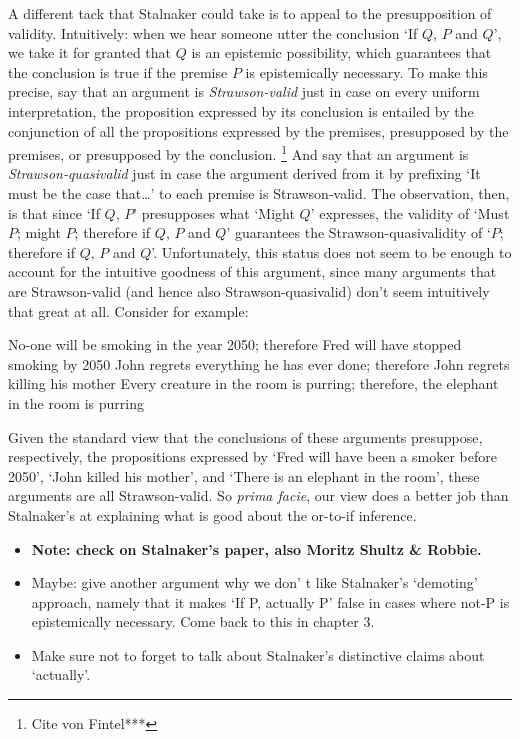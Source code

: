 \documentclass[If.tex]{subfiles}
\begin{document}
A different tack that Stalnaker could take is to appeal to the presupposition of validity.  Intuitively: when we hear someone utter the conclusion ‘If $Q$, $P$ and $Q$’, we take it for granted that $Q$ is an epistemic possibility, which guarantees that the conclusion is true if the premise $P$ is epistemically necessary.  To make this precise, say that an argument is \emph{Strawson-valid} just in case on every uniform interpretation, the proposition expressed by its conclusion is entailed by the conjunction of all the propositions expressed by the premises, presupposed by the premises, or presupposed by the conclusion.%
\footnote{Cite von Fintel***}  
And say that an argument is \emph{Strawson-quasivalid} just in case the argument derived from it by prefixing ‘It must be the case that…’ to each premise is Strawson-valid.  The observation, then, is that since ‘If $Q$, $P$’ presupposes what ‘Might $Q$’ expresses, the validity of ‘Must $P$; might $P$; therefore if $Q$, $P$ and $Q$’ guarantees the Strawson-quasivalidity of ‘$P$; therefore if $Q$, $P$ and $Q$’.  Unfortunately, this status does not seem to be enough to account for the intuitive goodness of this argument, since many arguments that are Strawson-valid (and hence also Strawson-quasivalid) don't seem intuitively that great at all.  Consider for example:
\begin{prop}
	\nitem 
	No-one will be smoking in the year 2050; therefore Fred will have stopped smoking by 2050
	\nitem 
	John regrets everything he has ever done; therefore John regrets killing his mother
	\nitem 
	Every creature in the room is purring; therefore, the elephant in the room is purring
\end{prop}
Given the standard view that the conclusions of these arguments presuppose, respectively, the propositions expressed by ‘Fred will have been a smoker before 2050’, ‘John killed his mother’, and ‘There is an elephant in the room’, these arguments are all Strawson-valid.  So \emph{prima facie}, our view does a better job than Stalnaker's at explaining what is good about the or-to-if inference.

\begin{itemize}
	\item
	\textbf{Note: check on Stalnaker's paper, also Moritz Shultz \& Robbie.}
	\item
	Maybe: give another argument why we don' t like Stalnaker's ‘demoting’ approach, namely that it makes ‘If P, actually P’ false in cases where not-P is epistemically necessary. Come back to this in chapter 3. 
	\item
	Make sure not to forget to talk about Stalnaker's distinctive claims about ‘actually’. 
\end{itemize}
\end{document}
